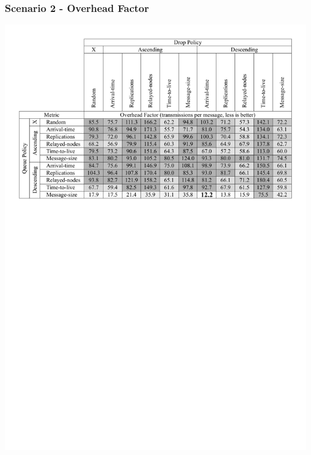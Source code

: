 \begin{frame}
  \frametitle{Scenario 2 - Overhead Factor}
  \begin{center}
   \includegraphics[width=1.0\textwidth]{fig/tables/scenario2_part2.pdf}
  \end{center}
\end{frame}

